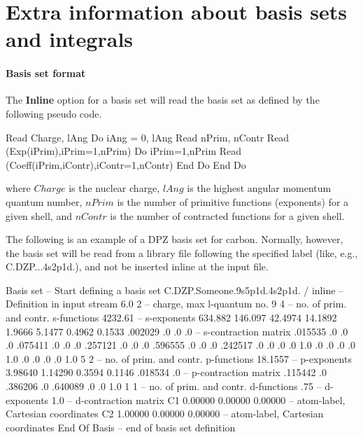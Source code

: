 \section{Extra information about basis sets and integrals}


\paragraph{Basis set format}

The {\bf Inline} option for a basis set will read the basis set
as defined by the following pseudo code.
\begin{sourcelisting}
      Read Charge, lAng
      Do iAng = 0, lAng
         Read nPrim, nContr
         Read (Exp(iPrim),iPrim=1,nPrim)
         Do iPrim=1,nPrim
            Read (Coeff(iPrim,iContr),iContr=1,nContr)
         End Do
      End Do
\end{sourcelisting}

where $Charge$ is the nuclear charge, $lAng$ is the highest angular
momentum quantum number, $nPrim$ is the number of primitive functions
(exponents) for a given shell, and $nContr$ is the number of contracted
functions for a given shell.

The following is an example of a DPZ basis set for carbon.
Normally, however, the basis set will be read from a library file following
the specified label (like, e.g., C.DZP...4s2p1d.), 
and not be inserted inline at the input file.

\begin{inputlisting}
Basis set                                -- Start defining a basis set
C.DZP.Someone.9s5p1d.4s2p1d. / inline    -- Definition in input stream
       6.0              2                -- charge, max l-quantum no.
    9    4                               -- no. of prim. and contr. s-functions
4232.61                                  -- s-exponents
634.882
146.097
42.4974
14.1892
1.9666
5.1477
0.4962
0.1533
  .002029   .0       .0       .0         -- s-contraction matrix
  .015535   .0       .0       .0
  .075411   .0       .0       .0
  .257121   .0       .0       .0
  .596555   .0       .0       .0
  .242517   .0       .0       .0
  .0       1.0       .0       .0
  .0        .0      1.0       .0
  .0        .0       .0      1.0
    5    2                               -- no. of prim. and contr. p-functions
18.1557                                  -- p-exponents
3.98640
1.14290
0.3594
0.1146
 .018534   .0                            -- p-contraction matrix
 .115442   .0
 .386206   .0
 .640089   .0
 .0       1.0
    1    1                               -- no. of prim. and contr. d-functions
   .75                                   -- d-exponents
  1.0                                    -- d-contraction matrix
C1 0.00000 0.00000 0.00000               -- atom-label, Cartesian coordinates
C2 1.00000 0.00000 0.00000               -- atom-label, Cartesian coordinates
End Of Basis                             -- end of basis set definition
\end{inputlisting}


